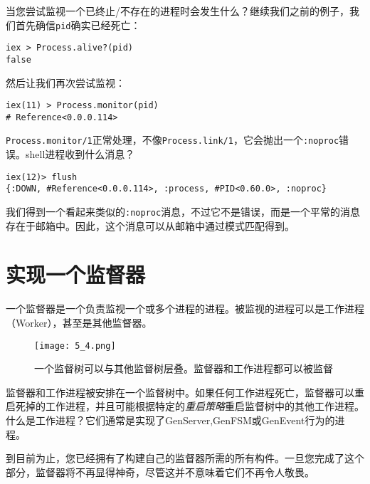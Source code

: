 当您尝试监视一个已终止/不存在的进程时会发生什么？继续我们之前的例子，我们首先确信\texttt{pid}确实已经死亡：

\begin{code}{}
\begin{verbatim}
iex > Process.alive?(pid)
false
\end{verbatim}
\end{code}

然后让我们再次尝试监视：

\begin{code}{}
\begin{verbatim}
iex(11) > Process.monitor(pid)
# Reference<0.0.0.114>
\end{verbatim}
\end{code}

\texttt{Process.monitor/1}正常处理，不像\texttt{Process.link/1}，它会抛出一个\texttt{:noproc}错误。shell进程收到什么消息？

\begin{code}{}
\begin{verbatim}
iex(12)> flush
{:DOWN, #Reference<0.0.0.114>, :process, #PID<0.60.0>, :noproc}
\end{verbatim}
\end{code}

我们得到一个看起来类似的\texttt{:noproc}消息，不过它不是错误，而是一个平常的消息存在于邮箱中。因此，这个消息可以从邮箱中通过模式匹配得到。

\section{实现一个监督器}

一个监督器是一个负责监视一个或多个进程的进程。被监视的进程可以是工作进程（Worker），甚至是其他监督器。

\begin{figure}[!ht]
    \centering
    \texttt{[image: 5\_4.png]}
    \caption{一个监督树可以与其他监督树层叠。监督器和工作进程都可以被监督}
    \label{fig:5_4}
\end{figure}


监督器和工作进程被安排在一个监督树中。如果任何工作进程死亡，监督器可以重启死掉的工作进程，并且可能根据特定的\emph{重启策略}重启监督树中的其他工作进程。什么是工作进程？它们通常是实现了GenServer,GenFSM或GenEvent行为的进程。

到目前为止，您已经拥有了构建自己的监督器所需的所有构件。一旦您完成了这个部分，监督器将不再显得神奇，尽管这并不意味着它们不再令人敬畏。

